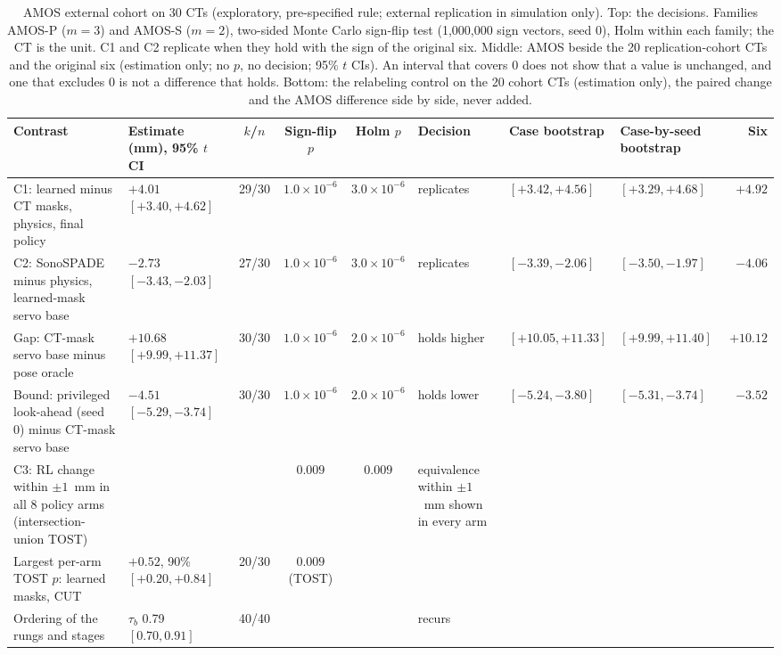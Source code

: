 
\begin{table}[tp]
\renewcommand{\baselinestretch}{1}\scriptsize
\caption{AMOS external cohort on 30 CTs (exploratory, pre-specified rule; external replication in simulation only). Top: the decisions. Families AMOS-P ($m = 3$) and AMOS-S ($m = 2$), two-sided Monte Carlo sign-flip test (1,000,000 sign vectors, seed 0), Holm within each family; the CT is the unit. C1 and C2 replicate when they hold with the sign of the original six. Middle: AMOS beside the 20 replication-cohort CTs and the original six (estimation only; no $p$, no decision; 95\% $t$ CIs). An interval that covers 0 does not show that a value is unchanged, and one that excludes 0 is not a difference that holds. Bottom: the relabeling control on the 20 cohort CTs (estimation only), the paired change and the AMOS difference side by side, never added.}
\label{tab:amos-results}
\centering
\setlength{\tabcolsep}{2.5pt}
\begin{tabularx}{\textwidth}{@{}>{\raggedright\arraybackslash}X l c c c >{\raggedright\arraybackslash}p{} l l r@{}}
\toprule
Contrast & Estimate (mm), 95\% $t$ CI & $k$/$n$ & Sign-flip $p$ & Holm $p$ & Decision & Case bootstrap & Case-by-seed bootstrap & Six \\
\midrule
\quad C1: learned minus CT masks, physics, final policy & $+4.01$ $[+3.40, +4.62]$ & 29/30 & $1.0 \times 10^{-6}$ & $3.0 \times 10^{-6}$ & replicates & $[+3.42, +4.56]$ & $[+3.29, +4.68]$ & $+4.92$ \\
\quad C2: SonoSPADE minus physics, learned-mask servo base & $-2.73$ $[-3.43, -2.03]$ & 27/30 & $1.0 \times 10^{-6}$ & $3.0 \times 10^{-6}$ & replicates & $[-3.39, -2.06]$ & $[-3.50, -1.97]$ & $-4.06$ \\
\quad Gap: CT-mask servo base minus pose oracle & $+10.68$ $[+9.99, +11.37]$ & 30/30 & $1.0 \times 10^{-6}$ & $2.0 \times 10^{-6}$ & holds higher & $[+10.05, +11.33]$ & $[+9.99, +11.40]$ & $+10.12$ \\
\quad Bound: privileged look-ahead (seed 0) minus CT-mask servo base & $-4.51$ $[-5.29, -3.74]$ & 30/30 & $1.0 \times 10^{-6}$ & $2.0 \times 10^{-6}$ & holds lower & $[-5.24, -3.80]$ & $[-5.31, -3.74]$ & $-3.52$ \\
\quad C3: RL change within $\pm 1$~mm in all 8 policy arms (intersection-union TOST) & & & $0.009$ & $0.009$ & equivalence within $\pm 1$~mm shown in every arm & & & \\
\quad\quad Largest per-arm TOST $p$: learned masks, CUT & $+0.52$, 90\% $[+0.20, +0.84]$ & 20/30 & $0.009$ (TOST) & & & & & \\
\quad Ordering of the rungs and stages & $\tau_b$ 0.79 $[0.70, 0.91]$ & 40/40 & & & recurs & & & \\
\bottomrule
\end{tabularx}


\end{table}
